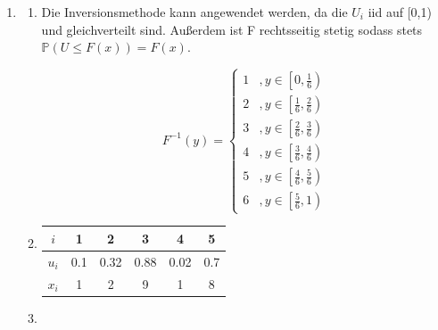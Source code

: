 \documentclass[a4paper]{scrartcl}
\def \blattnr {12}
\begin{document}
\begin{enumerate}[label=\bfseries \blattnr.\arabic*]
    \item %
        \begin{enumerate}
            \item
              Die Inversionsmethode kann angewendet werden, da die $U_i$ iid auf 
              [0,1) und gleichverteilt sind. Außerdem ist F rechtsseitig stetig 
              sodass stets \\ 
              $\mathbb{P}(U\leq F(x))=F(x)$.
              
	      \begin{equation*}
		F^{-1}(y) = \begin{cases}
			      1 &, y \in \left[0,\frac16 \right) \\
			      2 &, y \in \left[\frac16, \frac26 \right)\\
			      3 &, y \in \left[\frac26,\frac36 \right)\\
			      4 &, y \in \left[\frac36,\frac46 \right)\\
			      5 &, y \in \left[\frac46,\frac56 \right)\\
			      6 &, y \in \left[\frac56,1 \right)
		            \end{cases}
	      \end{equation*}
	      
            \item
	      \begin{tabular}{c|c|c|c|c|c}
	       $i$ & 1 & 2 & 3 & 4 & 5 \\
	       \hline
	       $u_i$ & 0.1 & 0.32 & 0.88 & 0.02 & 0.7 \\
	       \hline
	       $x_i$ & 1 & 2 & 9 & 1 & 8
	      \end{tabular}

            \item

        \end{enumerate}


\end{enumerate}
\end{document}

